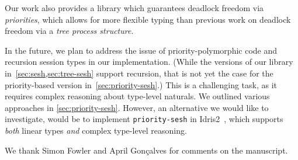 \documentclass[sigplan,screen]{acmart}
\begin{document}
Our work also provides a library which guarantees deadlock freedom via \emph{priorities}, which allows for more flexible typing than previous work on deadlock freedom via a \emph{tree process structure}.

In the future, we plan to address the issue of priority-polymorphic code and recursion session types in our implementation. (While the versions of our library in~\cref{sec:sesh,sec:tree-sesh} support recursion, that is not yet the case for the priority-based version in~\cref{sec:priority-sesh}.) This is a challenging task, as it requires complex reasoning about type-level naturals. We outlined various approaches in \cref{sec:priority-sesh}. However, an alternative we would like to investigate, would be to implement \texttt{priority-sesh} in Idris2~\cite{brady13,brady17}, which supports \emph{both} linear types \emph{and} complex type-level reasoning.

\begin{acks}
  We thank Simon Fowler and April Gon\c{c}alves for comments on the manuscript.
\end{acks}


\end{document}
